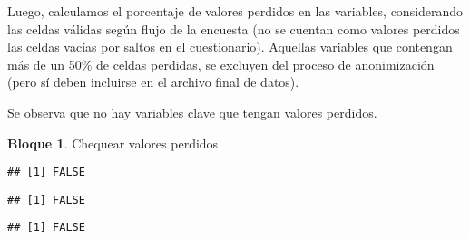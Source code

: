 \documentclass[
]{book}
\newenvironment{Shaded}{\begin{snugshade}}{\end{snugshade}}
\newcommand{\FunctionTok}[1]{\textcolor[rgb]{0.00,0.00,0.00}{#1}}
\newcommand{\NormalTok}[1]{#1}
\newcommand{\SpecialCharTok}[1]{\textcolor[rgb]{0.00,0.00,0.00}{#1}}
\theoremstyle{definition}
\theoremstyle{definition}
\newtheorem{example}{Bloque}[chapter]
\theoremstyle{definition}
\theoremstyle{definition}
\theoremstyle{remark}
\begin{document}
Luego, calculamos el porcentaje de valores perdidos en las variables, considerando las celdas válidas según flujo de la encuesta (no se cuentan como valores perdidos las celdas vacías por saltos en el cuestionario). Aquellas variables que contengan más de un 50\% de celdas perdidas, se excluyen del proceso de anonimización (pero sí deben incluirse en el archivo final de datos).

Se observa que no hay variables clave que tengan valores perdidos.

\begin{example}
\protect\hypertarget{exm:bloque35nbm}{}\label{exm:bloque35nbm}Chequear valores perdidos
\end{example}

\begin{Shaded}
\end{Shaded}

\begin{verbatim}
## [1] FALSE
\end{verbatim}

\begin{Shaded}
\end{Shaded}

\begin{verbatim}
## [1] FALSE
\end{verbatim}

\begin{Shaded}
\end{Shaded}

\begin{verbatim}
## [1] FALSE
\end{verbatim}

\begin{Shaded}
\end{Shaded}
\end{document}
